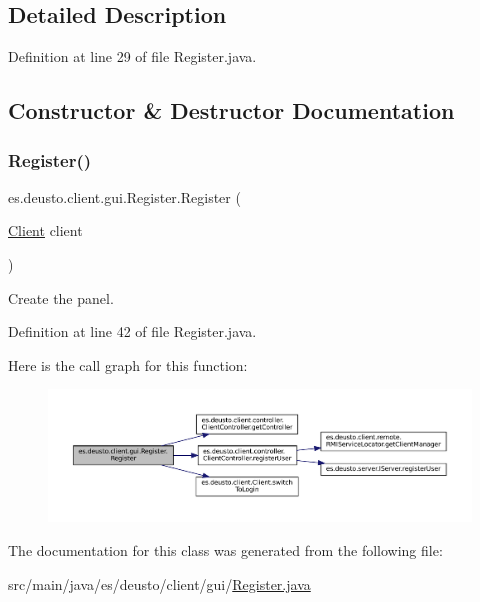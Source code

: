 \subsection{Detailed Description}


Definition at line 29 of file Register.\+java.



\subsection{Constructor \& Destructor Documentation}
\mbox{\label{classes_1_1deusto_1_1client_1_1gui_1_1_register_a5b463722d846413a2b1e929207c0f20d}} 
\subsubsection{\texorpdfstring{Register()}{Register()}}
{\footnotesize\ttfamily es.\+deusto.\+client.\+gui.\+Register.\+Register (\begin{DoxyParamCaption}\item[{\mbox{\hyperlink{classes_1_1deusto_1_1client_1_1_client}{Client}}}]{client }\end{DoxyParamCaption})}

Create the panel. 

Definition at line 42 of file Register.\+java.

Here is the call graph for this function\+:\nopagebreak
\begin{figure}[H]
\begin{center}
\leavevmode
\includegraphics[width=350pt]{classes_1_1deusto_1_1client_1_1gui_1_1_register_a5b463722d846413a2b1e929207c0f20d_cgraph}
\end{center}
\end{figure}


The documentation for this class was generated from the following file\+:\begin{DoxyCompactItemize}
\item 
src/main/java/es/deusto/client/gui/\mbox{\hyperlink{_register_8java}{Register.\+java}}\end{DoxyCompactItemize}
